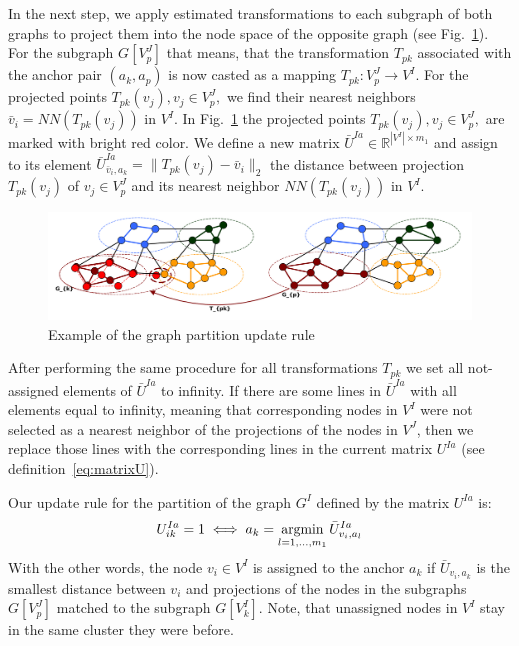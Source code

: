 In the next step, we apply estimated transformations to each subgraph of both graphs to project them into the node space of the opposite graph (see Fig.~\ref{fig:update}). For the subgraph $G[V^J_p]$ that means, that the transformation $T_{pk}$ associated with the anchor pair $(a_k,a_p)$ is now casted as a mapping $T_{pk}:V^J_p\rightarrow V^I$. For the projected points $T_{pk}(v_j),v_j\in V^J_p,$ we find their nearest neighbors $\bar{v}_i=NN(T_{pk}(v_j))$ in $V^I$. In Fig.~\ref{fig:update} the projected points $T_{pk}(v_j),v_j\in V^J_p,$ are marked with bright red color. We define a new matrix $\bar{U}^{Ia}\in\mathbb{R}^{|V^I|\times m_1}$ and assign to its element $\bar{U}^{Ia}_{\bar{v}_i,a_k}=\|T_{pk}(v_j)-\bar{v}_i\|_2$ the distance between projection $T_{pk}(v_j)$ of $v_j\in V^J_p$ and its nearest neighbor $NN(T_{pk}(v_j))$ in $V^I$.

\begin{figure}[h]
	\centering
	\includegraphics[scale=0.35]{chapter2/fig/update.pdf}
	\caption{Example of the graph partition update rule} \label{fig:update}
\end{figure}

After performing the same procedure for all transformations $T_{pk}$ we set all not-assigned elements of $\bar{U}^{Ia}$ to infinity. If there are some lines in $\bar{U}^{Ia}$ with all elements equal to infinity, meaning that corresponding nodes in $V^I$ were not selected as a nearest neighbor of the projections of the nodes in $V^J$,
then we replace those lines with the corresponding lines in the current matrix $U^{Ia}$ (see definition~\eqref{eq:matrixU}).

Our update rule for the partition of the graph $G^I$ defined by the matrix $U^{Ia}$ is:
\begin{equation}
U^{Ia}_{ik}=1 \iff a_k=\mathop{\rm argmin}_{l=1,\dots,m_1}^{}{\bar{U}^{Ia}_{v_i,a_l}}
\end{equation}
With the other words, the node $v_i\in V^I$ is assigned to the anchor $a_k$ if $\bar{U}_{v_i,a_k}$ is the smallest distance between $v_i$ and projections of the nodes in the subgraphs $G[V^J_p]$ matched to the subgraph $G[V^I_k]$. Note, that unassigned nodes in $V^I$ stay in the same cluster they were before.

